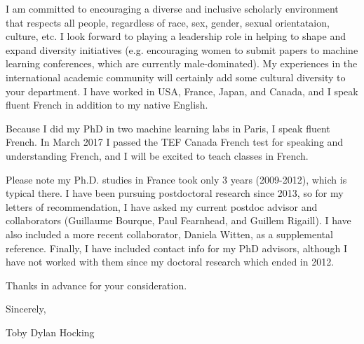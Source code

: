 \documentclass{article}
\begin{document}
I am committed to encouraging a diverse and inclusive scholarly
environment that respects all people, regardless of race, sex, gender,
sexual orientataion, culture, etc. I look forward to playing a
leadership role in helping to shape and expand diversity initiatives
(e.g. encouraging women to submit papers to machine learning
conferences, which are currently male-dominated). My experiences in
the international academic community will certainly add some cultural
diversity to your department. I have worked in USA, France, Japan, and
Canada, and I speak fluent French in addition to my native English.

Because I did my PhD in two machine learning labs in Paris, I speak
fluent French. In March 2017 I passed the TEF Canada French test for
speaking and understanding French, and I will be excited to teach
classes in French. 

Please note my Ph.D. studies in France took only 3
years (2009-2012), which is typical there.
I have been pursuing postdoctoral research since 2013, so for my
letters of recommendation, I have asked my current postdoc advisor and
collaborators (Guillaume Bourque, Paul Fearnhead, and Guillem
Rigaill). I have also included a more recent collaborator, Daniela
Witten, as a supplemental reference. Finally, I have included contact
info for my PhD advisors, although I have not worked with them since
my doctoral research which ended in 2012.

Thanks in advance for your consideration.

Sincerely,


Toby Dylan Hocking




\end{document}
